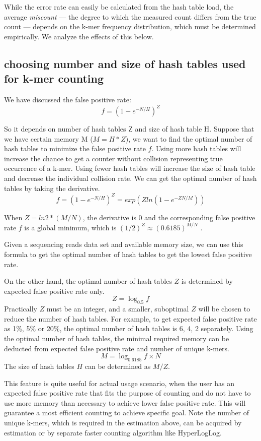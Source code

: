 \documentclass[10pt]{article}
\begin{document}
While the error rate can easily be calculated from the hash table
load, the average {\em miscount} --- the degree to which the measured
count differs from the true count --- depends on the k-mer frequency
distribution, which must be determined empirically.  We analyze the
effects of this below.


\subsection*{choosing number and size of hash tables used for k-mer counting} 

We have discussed the false positive rate: \[f=(1-e^{-N/H})^{Z}\]

So it depends on number of hash tables Z and size of hash table H.
Suppose that we have certain memory M ($M=H*Z$), we want to find the
optimal number of hash tables to minimize the false positive rate $f$.
Using more hash tables will increase the chance to get a counter
without collision representing true occurrence of a k-mer. Using fewer
hash tables will increase the size of hash table and decrease the
individual collision rate. We can get the optimal number of hash
tables by taking the
derivative. \[f=(1-e^{-N/H})^{Z}=exp(Zln(1-e^{-ZN/M}))\]

When $Z=ln2*(M/N)$, the derivative is 0 and the corresponding false
positive rate $f$ is a global minimum, which is
$(1/2)^Z\approx(0.6185)^{M/N}$ \cite{broder2004network}.

Given a sequencing reads data set and available memory size, we can
use this formula to get the optimal number of hash tables to get the
lowest false positive rate.

On the other hand, the optimal number of hash tables $Z$ is determined
by expected false positive rate only. \[ Z=\log_{0.5}f\] Practically
$Z$ must be an integer, and a smaller, suboptimal $Z$ will be chosen
to reduce the number of hash tables.  For example, to get expected
false positive rate as 1\%, 5\% or 20\%, the optimal number of hash
tables is 6, 4, 2 separately. Using the optimal number of hash tables,
the minimal required memory can be deducted from expected false
positive rate and number of unique k-mers. \[ M=\log_{0.6185}f\times
N\] The size of hash tables $H$ can be determined as $M/Z$.

This feature is quite useful for actual usage scenario, when the user
has an expected false positive rate that fits the purpose of counting
and do not have to use more memory than necessary to achieve lower
false positive rate. This will guarantee a most efficient counting to
achieve specific goal.  Note the number of unique k-mers, which is
required in the estimation above, can be acquired by estimation or by
separate faster counting algorithm like HyperLogLog.
\end{document}
